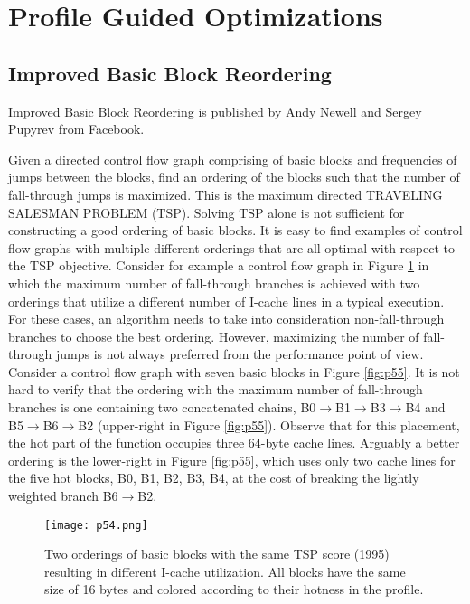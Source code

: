 \newpage


\section{Profile Guided Optimizations}



\subsection{Improved Basic Block Reordering}

Improved Basic Block Reordering \cite{newell2020improved} is published by Andy Newell and Sergey Pupyrev
from Facebook. 


Given a directed control flow graph comprising of basic blocks and frequencies of jumps between the blocks, find an ordering
of the blocks such that the number of fall-through jumps
is maximized. This is the maximum directed TRAVELING
SALESMAN PROBLEM (TSP). Solving TSP alone is not sufficient for constructing a good ordering of basic blocks. It is easy to find
examples of control flow graphs with multiple different
orderings that are all optimal with respect to the TSP objective. Consider for example a control flow graph in Figure \ref{fig:p54}
in which the maximum number of fall-through branches is
achieved with two orderings that utilize a different number
of I-cache lines in a typical execution. For these cases, an
algorithm needs to take into consideration non-fall-through
branches to choose the best ordering. However, maximizing the number of fall-through jumps is not always preferred
from the performance point of view. Consider a control
flow graph with seven basic blocks in Figure \ref{fig:p55}. It is not hard
to verify that the ordering with the maximum number of
fall-through branches is one containing two concatenated
chains, B0$\rightarrow$B1$\rightarrow$B3$\rightarrow$B4 and B5$\rightarrow$B6$\rightarrow$B2 (upper-right in
Figure \ref{fig:p55}). Observe that for this placement, the hot part of
the function occupies three 64-byte cache lines. Arguably a
better ordering is the lower-right in Figure \ref{fig:p55}, which uses only
two cache lines for the five hot blocks, B0, B1, B2, B3, B4, at
the cost of breaking the lightly weighted branch B6$\rightarrow$B2.



\begin{figure}[H]
    \centering
     \texttt{[image: p54.png]}
         \caption{ Two orderings of basic blocks with the same TSP score (1995)
         resulting in different I-cache utilization. All blocks have the same size of
         16 bytes and colored according to their hotness in the profile.}
         \label{fig:p54}
\end{figure}


